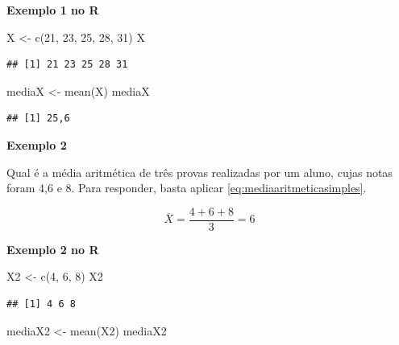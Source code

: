 \documentclass[
]{book}
\newenvironment{Shaded}{\begin{snugshade}}{\end{snugshade}}
\newcommand{\DecValTok}[1]{\textcolor[rgb]{0.00,0.00,0.81}{#1}}
\newcommand{\FunctionTok}[1]{\textcolor[rgb]{0.00,0.00,0.00}{#1}}
\newcommand{\NormalTok}[1]{#1}
\newcommand{\OtherTok}[1]{\textcolor[rgb]{0.56,0.35,0.01}{#1}}
\begin{document}
\textbf{Exemplo 1 no R}

\begin{Shaded}
\begin{Highlighting}[]
\NormalTok{X }\OtherTok{\textless{}{-}} \FunctionTok{c}\NormalTok{(}\DecValTok{21}\NormalTok{, }\DecValTok{23}\NormalTok{, }\DecValTok{25}\NormalTok{, }\DecValTok{28}\NormalTok{, }\DecValTok{31}\NormalTok{)}
\NormalTok{X}
\end{Highlighting}
\end{Shaded}

\begin{verbatim}
## [1] 21 23 25 28 31
\end{verbatim}

\begin{Shaded}
\begin{Highlighting}[]
\NormalTok{mediaX }\OtherTok{\textless{}{-}} \FunctionTok{mean}\NormalTok{(X)}
\NormalTok{mediaX}
\end{Highlighting}
\end{Shaded}

\begin{verbatim}
## [1] 25,6
\end{verbatim}

\textbf{Exemplo 2}

Qual é a média aritmética de três provas realizadas por um aluno, cujas notas
foram 4,6 e 8. Para responder, basta aplicar \eqref{eq:mediaaritmeticasimples}.

\begin{equation*}
  \overline{X} = \frac{4+6+8}{3} = 6
\end{equation*}

\textbf{Exemplo 2 no R}

\begin{Shaded}
\begin{Highlighting}[]
\NormalTok{X2 }\OtherTok{\textless{}{-}} \FunctionTok{c}\NormalTok{(}\DecValTok{4}\NormalTok{, }\DecValTok{6}\NormalTok{, }\DecValTok{8}\NormalTok{)}
\NormalTok{X2}
\end{Highlighting}
\end{Shaded}

\begin{verbatim}
## [1] 4 6 8
\end{verbatim}

\begin{Shaded}
\begin{Highlighting}[]
\NormalTok{mediaX2 }\OtherTok{\textless{}{-}} \FunctionTok{mean}\NormalTok{(X2)}
\NormalTok{mediaX2}
\end{Highlighting}
\end{Shaded}
\end{document}
